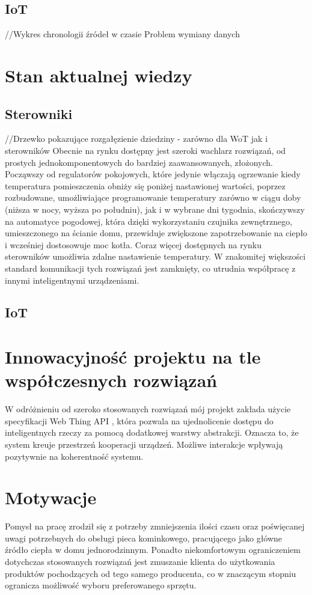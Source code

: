 \documentclass[11pt]{report}
\begin{document}
 \subsection{IoT}
 //Wykres chronologii źródeł w czasie
 Problem wymiany danych 
 
 \section{Stan aktualnej wiedzy}
 \subsection{Sterowniki}
 //Drzewko pokazujące rozgałęzienie dziedziny - zarówno dla WoT jak i sterowników
 Obecnie na rynku dostępny jest szeroki wachlarz rozwiązań, od prostych jednokomponentowych do bardziej zaawansowanych, złożonych. Począwszy od regulatorów pokojowych, które jedynie włączają ogrzewanie kiedy temperatura pomieszczenia obniży się poniżej nastawionej wartości, poprzez rozbudowane, umożliwiające programowanie temperatury zarówno w ciągu doby (niższa w nocy, wyższa po południu), jak i w wybrane dni tygodnia, skończywszy na automatyce pogodowej, która dzięki wykorzystaniu czujnika zewnętrznego, umieszczonego na ścianie domu, przewiduje zwiększone zapotrzebowanie na ciepło i wcześniej dostosowuje moc kotła.
 Coraz więcej dostępnych na rynku sterowników umożliwia zdalne nastawienie temperatury. W znakomitej większości standard komunikacji tych rozwiązań jest zamknięty, co utrudnia współpracę  z innymi inteligentnymi urządzeniami.
 \subsection{IoT}
 
 \section{Innowacyjność projektu na tle współczesnych rozwiązań}
 W odróżnieniu od szeroko stosowanych rozwiązań mój projekt zakłada użycie specyfikacji Web Thing API \cite{Mazurek2018}, która pozwala na ujednolicenie dostępu do inteligentnych rzeczy za pomocą dodatkowej warstwy abstrakcji. Oznacza to, że system kreuje przestrzeń kooperacji urządzeń. Możliwe interakcje wpływają pozytywnie na koherentność systemu.
 
 \section{Motywacje}
Pomysł na pracę zrodził się z potrzeby zmniejszenia ilości czasu oraz poświęcanej uwagi potrzebnych do obsługi pieca kominkowego, pracującego jako główne źródło ciepła w domu jednorodzinnym. Ponadto niekomfortowym ograniczeniem dotychczas stosowanych rozwiązań jest zmuszanie klienta do użytkowania produktów pochodzących od tego samego producenta, co w znaczącym stopniu ogranicza możliwość wyboru preferowanego sprzętu.
\end{document}
